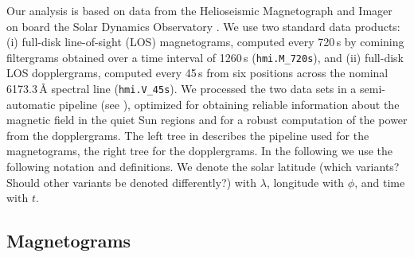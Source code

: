 \documentclass{aa}
\begin{document}
Our analysis is based on data from the Helioseismic Magnetograph and Imager \cite[HMI,][]{2012SoPh..275..207S,2012SoPh..275..229S} on board the Solar Dynamics Observatory \cite[SDO,][]{2012SoPh..275....3P}. We use two standard data products: (i) full-disk line-of-sight (LOS) magnetograms, computed every 720\,s by comining filtergrams obtained over a time interval of 1260\,s (\texttt{hmi.M\_720s}), and (ii) full-disk LOS dopplergrams, computed every 45\,s from six positions across the nominal 6173.3\,\AA{} spectral line (\texttt{hmi.V\_45s}). We processed the two data sets in a semi-automatic pipeline (see ), optimized for obtaining reliable information %
about
the magnetic field in the quiet Sun regions and for a robust computation of the \fff power from the dopplergrams. The left tree in  describes the pipeline used for the magnetograms, the right tree for the dopplergrams.
In the following we use the following notation and definitions. 
We denote the solar latitude (which variants? Should other variants be denoted differently?) with 
$\lambda$, longitude with $\phi$, and time with $t$. 


\subsection{Magnetograms}
\end{document}
